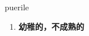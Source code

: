 
\begin{frame}
{\huge puerile}
\begin{center}
\begin{enumerate}\Large
  \item \textbf{幼稚的，不成熟的}
\end{enumerate}
\end{center}
\end{frame}

